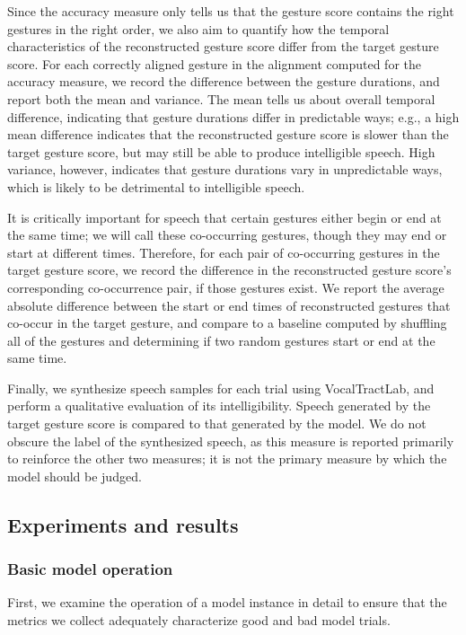 Since the accuracy measure only tells us
that the gesture score contains
the right gestures in the right order,
we also aim to quantify
how the temporal characteristics
of the reconstructed gesture score
differ from the target gesture score.
For each correctly aligned gesture
in the alignment computed
for the accuracy measure,
we record the difference
between the gesture durations,
and report both the mean and variance.
The mean tells us about
overall temporal difference,
indicating that gesture durations
differ in predictable ways;
e.g., a high mean difference
indicates that
the reconstructed gesture score
is slower than the target gesture score,
but may still be able to
produce intelligible speech.
High variance, however,
indicates that
gesture durations vary in unpredictable ways,
which is likely to be detrimental
to intelligible speech.

It is critically important
for speech that certain gestures
either begin or end at the same time;
we will call these co-occurring gestures,
though they may end or start at different times.
Therefore, for each pair
of co-occurring gestures in the
target gesture score,
we record the difference
in the reconstructed gesture score's
corresponding co-occurrence pair,
if those gestures exist.
We report the average absolute
difference between the start or end times
of reconstructed gestures
that co-occur in the target gesture,
and compare to a baseline
computed by shuffling all of the gestures
and determining if two random gestures
start or end at the same time.

Finally, we synthesize speech samples
for each trial using VocalTractLab,
and perform a qualitative evaluation
of its intelligibility.
Speech generated by the
target gesture score is compared
to that generated by the model.
We do not obscure the label
of the synthesized speech,
as this measure is reported primarily
to reinforce the other two measures;
it is not the primary measure
by which the model should be judged.

\subsection{Experiments and results}
\label{sec:prod-results}

\subsubsection{Basic model operation}

First, we examine the operation
of a model instance in detail
to ensure that the metrics we collect
adequately characterize
good and bad model trials.

